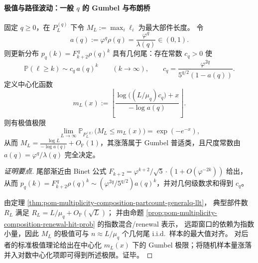 \paragraph{极值与路径波动：一般 \texorpdfstring{$q$}{q} 的 Gumbel 与布朗桥}
\begin{theorem}\label{thm:pom-multiplicity-composition-maxpart-gumbel-generalq}
固定 \(q\ge 0\)，在 \(P_L^{(q)}\) 下令 \(M_L:=\max_i \ell_i\) 为最大部件长度。
令
\[
a(q):=\varphi^{q}\rho(q)=\frac{\varphi^{q}}{\lambda(q)}\in(0,1).
\]
则更新分布 \(p_q(k)=F_{k+2}^{\,q}\rho(q)^k\) 具有几何尾：存在常数 \(c_q>0\) 使
\[
\mathbb{P}(\ell\ge k)\sim c_q\,a(q)^k\qquad(k\to\infty),
\qquad
c_q=\frac{\varphi^{2q}}{5^{q/2}(1-a(q))}.
\]
定义中心化函数
\[
m_L(x):=\left\lfloor \frac{\log\!\bigl((L/\mu_q)c_q\bigr)+x}{-\log a(q)}\right\rfloor .
\]
则有极值极限
\[
\lim_{L\to\infty}\mathbb{P}_{P_L^{(q)}}\bigl(M_L\le m_L(x)\bigr)=\exp(-e^{-x}),
\]
从而
\(
M_L=\frac{\log L}{-\log a(q)}+O_{\mathbb{P}}(1)
\)，其涨落属于 Gumbel 普适类，且尺度常数由 \(a(q)=\varphi^{q}/\lambda(q)\) 完全决定。
\end{theorem}
\begin{proof}[证明要点]
尾部渐近由 Binet 公式 \(F_{k+2}=\varphi^{k+2}/\sqrt5\cdot(1+O(\varphi^{-2k}))\) 给出，
从而
\(
p_q(k)=F_{k+2}^{\,q}\rho(q)^k\sim (\varphi^{2q}/5^{q/2})a(q)^k
\)，并对几何级数求和得到 \(c_q\)。
\par
由定理 \ref{thm:pom-multiplicity-composition-partcount-generalq-llt}，
典型部件数 \(R_L\) 满足 \(R_L=L/\mu_q+O_{\mathbb{P}}(\sqrt{L})\)；
并由命题 \ref{prop:pom-multiplicity-composition-renewal-hit-prob} 的指数混合/renewal 表示，
远距窗口的依赖为指数小量，因此 \(M_L\) 的极值可与 \(n\approx L/\mu_q\) 个几何尾 i.i.d.\ 样本的最大值对齐。
对后者的标准极值理论给出在中心化 \(m_L(x)\) 下的 Gumbel 极限；将随机样本量涨落并入对数中心化项即可得到所述极限。证毕。
\end{proof}

